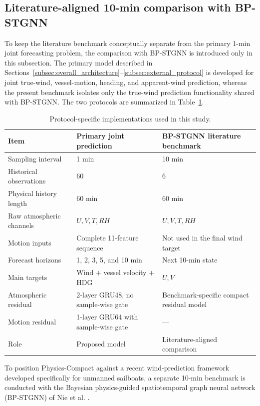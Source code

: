 \subsection{Literature-aligned 10-min comparison with BP-STGNN}
\label{subsec:bp_benchmark}

To keep the literature benchmark conceptually separate from the primary 1-min joint forecasting problem, the comparison with BP-STGNN is introduced only in this subsection. The primary model described in Sections~\ref{subsec:overall_architecture}--\ref{subsec:external_protocol} is developed for joint true-wind, vessel-motion, heading, and apparent-wind prediction, whereas the present benchmark isolates only the true-wind prediction functionality shared with BP-STGNN. The two protocols are summarized in Table~\ref{tab:protocols}.

\begin{table}[!t]
\centering
\caption{Protocol-specific implementations used in this study.}
\label{tab:protocols}
\begin{tabular}{p{3.3cm}p{5.4cm}p{5.4cm}}
\hline
\textbf{Item} &
\textbf{Primary joint prediction} &
\textbf{BP-STGNN literature benchmark} \\
\hline
Sampling interval
& 1 min
& 10 min
\\
Historical observations
& 60
& 6
\\
Physical history length
& 60 min
& 60 min
\\
Raw atmospheric channels
& $U,V,T,RH$
& $U,V,T,RH$
\\
Motion inputs
& Complete 11-feature sequence
& Not used in the final wind target
\\
Forecast horizons
& 1, 2, 3, 5, and 10 min
& Next 10-min state
\\
Main targets
& Wind + vessel velocity + HDG
& $U,V$
\\
Atmospheric residual
& 2-layer GRU48, no sample-wise gate
& Benchmark-specific compact residual model
\\
Motion residual
& 1-layer GRU64 with sample-wise gate
& ---
\\
Role
& Proposed model
& Literature-aligned comparison
\\
\hline
\end{tabular}
\end{table}


To position Physics-Compact against a recent wind-prediction framework developed specifically for unmanned sailboats, a separate 10-min benchmark is conducted with the Bayesian physics-guided spatiotemporal graph neural network (BP-STGNN) of Nie et al. \cite{Nie2026}.

